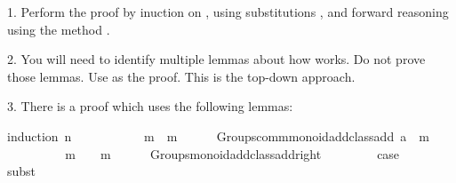 \begin{isabellebody}
\begin{isamarkuptext}
 1. Perform the proof by inuction on , using substitutions , and forward reasoning using
   the method .

 2. You will need to identify multiple lemmas about how  works. Do not prove those lemmas. Use 
     as the proof. This is the top-down approach. 

 3. There is a proof which uses the following lemmas:

\end{isamarkuptext}\isamarkuptrue%
%
\isadelimproof
%
\endisadelimproof
%
\isatagproof
{}\isamarkupfalse%
{\isacharparenleft}{\kern0pt}induction\ n{\isacharparenright}{\kern0pt}\isanewline
\ \ \isamarkupfalse%
\ {}\isanewline
\ \ \isamarkupfalse%
\ {}{\isacharcolon}{\kern0pt}\ {\isachardoublequoteopen}{}\ {\isacharplus}{\kern0pt}\ m\ {\isacharequal}{\kern0pt}\ m{\isachardoublequoteclose}\isanewline
\ \ \ \ \isamarkupfalse%
\ Groups{\isachardot}{\kern0pt}comm{\isacharunderscore}{\kern0pt}monoid{\isacharunderscore}{\kern0pt}add{\isacharunderscore}{\kern0pt}class{\isachardot}{\kern0pt}add{\isacharunderscore}{\kern0pt}{}{\isacharbrackleft}{\kern0pt}\ {\isacharquery}{\kern0pt}a\ {\isacharequal}{\kern0pt}\ m{\isacharbrackright}{\kern0pt}\isanewline
\ \ \ \ \isacommand{{\isachardot}{\kern0pt}}\isamarkupfalse%
\isanewline
\isanewline
\ \ \isamarkupfalse%
\ {}{\isacharcolon}{\kern0pt}\ {\isachardoublequoteopen}m\ {\isacharplus}{\kern0pt}\ {}\ {\isacharequal}{\kern0pt}\ m{\isachardoublequoteclose}\isanewline
\ \ \ \ \isamarkupfalse%
\ Groups{\isachardot}{\kern0pt}monoid{\isacharunderscore}{\kern0pt}add{\isacharunderscore}{\kern0pt}class{\isachardot}{\kern0pt}add{\isacharunderscore}{\kern0pt}{}{\isacharunderscore}{\kern0pt}right\isanewline
\ \ \ \ \isacommand{{\isachardot}{\kern0pt}}\isamarkupfalse%
\isanewline
\isanewline
\ \ \isamarkupfalse%
\ {\isacharquery}{\kern0pt}case\isanewline
\ \ \ \ \isamarkupfalse%
{\isacharparenleft}{\kern0pt}subst\ {}{\isacharparenright}{\kern0pt}\isanewline

\end{isabellebody}
